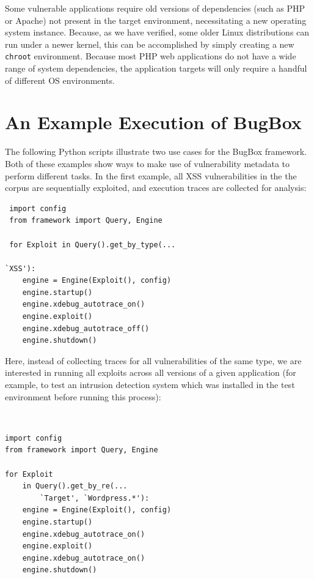 \documentclass[letterpaper,twocolumn,10pt]{article}
\begin{document}
Some vulnerable applications require old versions of dependencies (such as PHP or Apache) not present in the target environment, necessitating a new operating system instance. Because, as we have verified, some older Linux distributions can run under a newer kernel, this can be accomplished by simply creating a new \texttt{chroot} environment. Because most PHP web applications do not have a wide range of system dependencies, the application targets will only require a handful of different OS environments. \par

\section {An Example Execution of BugBox}

The following Python scripts illustrate two use cases for the BugBox framework. Both of these examples show ways to make use of vulnerability metadata to perform different tasks. In the first example, all XSS vulnerabilities in the the corpus are sequentially exploited, and execution traces are collected for analysis:

\begin{minipage}{\textwidth}
{\tt \footnotesize

\begin{lstlisting}
 import config
 from framework import Query, Engine
 
 for Exploit in Query().get_by_type(...
 																`XSS'):
    engine = Engine(Exploit(), config)
    engine.startup()
    engine.xdebug_autotrace_on()
    engine.exploit()
    engine.xdebug_autotrace_off()
    engine.shutdown()
\end{lstlisting}
}
\end{minipage}


Here, instead of collecting traces for all vulnerabilities of the same type, we are interested in running all exploits across all versions of a given application (for example, to test an intrusion detection system which was installed in the test environment before running this process):

\begin{minipage}{\textwidth}
{\tt \footnotesize
\begin{lstlisting}
import config
from framework import Query, Engine

for Exploit 
    in Query().get_by_re(...
        `Target', `Wordpress.*'):
    engine = Engine(Exploit(), config)
    engine.startup()
    engine.xdebug_autotrace_on()
    engine.exploit()
    engine.xdebug_autotrace_on()
    engine.shutdown()
\end{lstlisting}
}
\end{minipage}
\end{document}
